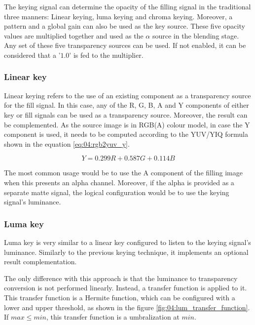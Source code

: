 \documentclass[../main.tex]{subfiles}
\begin{document}
The keying signal can determine the opacity of the filling signal in the traditional three manners: Linear keying, luma keying and chroma keying. Moreover, a pattern and a global gain can also be used as the key source. These five opacity values are multiplied together and used as the $\alpha$ source in the blending stage. Any set of these five transparency sources can be used. If not enabled, it can be considered that a '$1.0$' is fed to the multiplier.\newline

\subsubsection{Linear key}
Linear keying refers to the use of an existing component as a transparency source for the fill signal. In this case, any of the R, G, B, A and Y components of either key or fill signals can be used as a transparency source. Moreover, the result can be complemented. As the source image is in RGB(A) colour model, in case the Y component is used, it needs to be computed according to the YUV/YIQ formula shown in the equation \eqref{eq:04:rgb2yuv_y}.\newline

\begin{equation}\label{eq:04:rgb2yuv_y}
    Y = 0.299R + 0.587G + 0.114B
\end{equation}

The most common usage would be to use the A component of the filling image when this presents an alpha channel. Moreover, if the alpha is  provided as a separate matte signal, the logical configuration would be to use the keying signal's luminance.\newline

\subsubsection{Luma key}
Luma key is very similar to a linear key configured to listen to the keying signal's luminance. Similarly to the previous keying technique, it implements an optional result complementation.\newline

The only difference with this approach is that the luminance to transparency conversion is not performed linearly. Instead, a transfer function is applied to it. This transfer function is a Hermite function, which can be configured with a lower and upper threshold, as shown in the figure \ref{fig:04:lum_transfer_function}. If $max \leq min$, this transfer function is a umbralization at $min$.\newline
\end{document}
